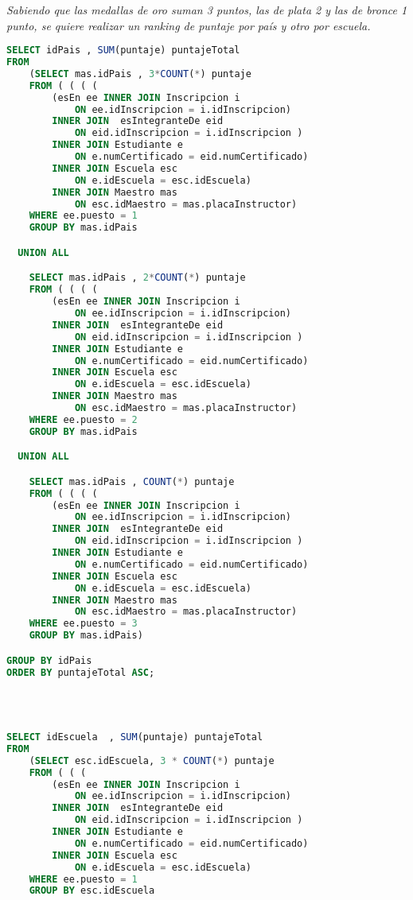 \emph{Sabiendo que las medallas de oro suman 3 puntos, las de plata 2 y las de bronce 1 punto, se quiere realizar un ranking de puntaje por país y otro por escuela.}
\begin{lstlisting}[language=SQL]
SELECT idPais , SUM(puntaje) puntajeTotal
FROM
    (SELECT mas.idPais , 3*COUNT(*) puntaje
    FROM ( ( ( (
        (esEn ee INNER JOIN Inscripcion i
            ON ee.idInscripcion = i.idInscripcion)
        INNER JOIN  esIntegranteDe eid
            ON eid.idInscripcion = i.idInscripcion )
        INNER JOIN Estudiante e
            ON e.numCertificado = eid.numCertificado)
        INNER JOIN Escuela esc
            ON e.idEscuela = esc.idEscuela)
        INNER JOIN Maestro mas
            ON esc.idMaestro = mas.placaInstructor)
    WHERE ee.puesto = 1
    GROUP BY mas.idPais

  UNION ALL

    SELECT mas.idPais , 2*COUNT(*) puntaje
    FROM ( ( ( (
        (esEn ee INNER JOIN Inscripcion i
            ON ee.idInscripcion = i.idInscripcion)
        INNER JOIN  esIntegranteDe eid
            ON eid.idInscripcion = i.idInscripcion )
        INNER JOIN Estudiante e
            ON e.numCertificado = eid.numCertificado)
        INNER JOIN Escuela esc
            ON e.idEscuela = esc.idEscuela)
        INNER JOIN Maestro mas
            ON esc.idMaestro = mas.placaInstructor)
    WHERE ee.puesto = 2
    GROUP BY mas.idPais

  UNION ALL

    SELECT mas.idPais , COUNT(*) puntaje
    FROM ( ( ( (
        (esEn ee INNER JOIN Inscripcion i
            ON ee.idInscripcion = i.idInscripcion)
        INNER JOIN  esIntegranteDe eid
            ON eid.idInscripcion = i.idInscripcion )
        INNER JOIN Estudiante e
            ON e.numCertificado = eid.numCertificado)
        INNER JOIN Escuela esc
            ON e.idEscuela = esc.idEscuela)
        INNER JOIN Maestro mas
            ON esc.idMaestro = mas.placaInstructor)
    WHERE ee.puesto = 3
    GROUP BY mas.idPais)

GROUP BY idPais
ORDER BY puntajeTotal ASC;




SELECT idEscuela  , SUM(puntaje) puntajeTotal
FROM
    (SELECT esc.idEscuela, 3 * COUNT(*) puntaje
    FROM ( ( (
        (esEn ee INNER JOIN Inscripcion i
            ON ee.idInscripcion = i.idInscripcion)
        INNER JOIN  esIntegranteDe eid
            ON eid.idInscripcion = i.idInscripcion )
        INNER JOIN Estudiante e
            ON e.numCertificado = eid.numCertificado)
        INNER JOIN Escuela esc
            ON e.idEscuela = esc.idEscuela)
    WHERE ee.puesto = 1
    GROUP BY esc.idEscuela


\end{lstlisting}
